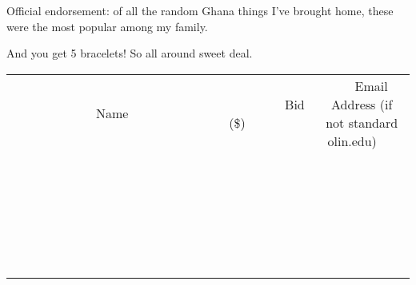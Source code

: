 \documentclass[11pt]{article}
\begin{document}
Official endorsement: of all the random Ghana things I've brought home, these were the most popular among my family.

And you get 5 bracelets! So all around sweet deal.
\\[6ex]
\begin{tabular}{c c c}
~~~~~~~~~~~~~Name~~~~~~~~~~~~~ & ~~~~~~~~~Bid (\$)~~~~~~~~~  & ~~~Email Address (if not standard olin.edu)~~~\\
 & & \\
\hline
 & & \\
\hline
 & & \\
\hline
 & & \\
\hline
 & & \\
\hline
 & & \\
\hline
 & & \\
\hline
 & & \\
\hline
 & & \\
\hline
 & & \\
\hline
 & & \\
\hline
 & & \\
\hline
 & & \\
\hline
 & & \\
\hline
 & & \\
\hline
 & & \\
\hline
 & & \\
\hline
 & & \\
\hline
 & & \\
\hline
 & & \\
\hline
 & & \\
\hline
 & & \\
\hline
 & & \\
\hline
 & & \\
\hline
 & & \\
\hline
 & & \\
\hline
\end{tabular}
\newpage
\end{document}
